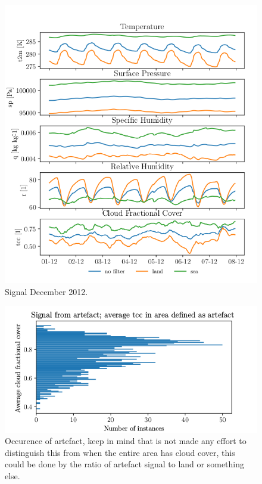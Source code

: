 \begin{figure}[ht]
    \centering
    \includegraphics{python_figs/spatially_averaged_one_week_from_2012-12-01.png}
    \caption{Signal December 2012.}
    \label{fig:dec12}
\end{figure}


\begin{figure}
    \centering
    \includegraphics{python_figs/signal_artefact.png}
    \caption{Occurence of artefact, keep in mind that is not made any effort to distinguish this from when the entire area has cloud cover, this could be done by the ratio of artefact signal to land or something else. }
    \label{fig:signal_artefact}
\end{figure}


